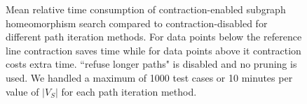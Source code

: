 \begin{figure}
\begin{subfigure} {0.5\linewidth}

\end{subfigure}

\caption{Mean relative time consumption of contraction-enabled subgraph homeomorphism search compared to contraction-disabled for different path iteration methods. For data points below the reference line contraction saves time while for data points above it contraction costs extra time. ``refuse longer paths" is disabled and no pruning is used. We handled a maximum of 1000 test cases or 10 minutes per value of $|V_S|$ for each path iteration method.}	
\label{fig:contraction-performance}
\end{figure}
